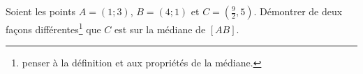 
\begin{exercice}\label{exoSeconde-0010}

    Soient les points \( A=(1;3)\), \( B=(4;1)\) et \( C=(\frac{ 9 }{ 2 },5)\). Démontrer de deux façons différentes\footnote{penser à la définition et aux propriétés de la médiane.} que \( C\) est sur la médiane de \( [AB]\).

\end{exercice}
